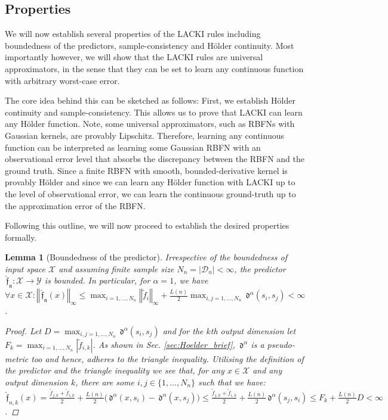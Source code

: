 \documentclass{article} %
\newtheorem{lem}[thm]{Lemma}
\theoremstyle{definition}
\theoremstyle{remark}
\newcommand{\norm}[1]{\left\Vert#1\right\Vert}
\newcommand{\abs}[1]{\left\vert#1\right\vert}
\newcommand{\data}{\ensuremath{ \mathcal D} }
\newcommand{\inspace}{\ensuremath{ \mathcal X}}
\newcommand{\outspace}{\ensuremath{ \mathcal Y}}
\newcommand{\metric}{\, \mathfrak{d}} %
\newcommand{\predf}{\, \mathfrak{  \hat f}} %
\newcommand{\predfn}{\, \mathfrak{  \hat f_n}} %
\newcommand{\hexp}{{ \alpha }}%
\begin{document}
\subsection{Properties}
\label{sec:properties_lacki}
We will now establish several properties of the LACKI rules including boundedness of the predictors, sample-consistency and H\"older continuity. Most importantly however, we will show that the LACKI rules are universal approximators, in the sense that they can be set to learn any continuous function with arbitrary worst-case error.

The core idea behind this can be sketched as follows: 
First, we establish H\"older continuity and sample-consistency. This allows us to prove that LACKI can learn any H\"older function.
Note, some universal approximators, such as RBFNs with Gaussian kernels, are provably Lipschitz. Therefore, learning any continuous function can be interpreted as learning some Gaussian RBFN with an observational error level that absorbs the discrepancy between the RBFN and the ground truth. Since a finite RBFN with smooth, bounded-derivative kernel is provably H\"older and since we can learn any H\"older function with LACKI up to the level of observational error, we can learn the continuous ground-truth up to the approximation error of the RBFN. 

Following this outline, we will now proceed to establish the desired properties formally.

\begin{lem}[Boundedness of the predictor]
Irrespective of the boundedness of input space $\inspace$ and assuming finite sample size  $N_n=\abs{\data_n} < \infty$, the predictor $\predfn:\inspace \to \outspace$ is bounded. In particular,
for $\hexp =1$, we have  
$\forall x \in \inspace: \norm{\predfn(x)}_\infty \leq \max_{i=1,...,N_n} \norm{\tilde f_i}_\infty + \frac{L(n)}{2}  \max_{i,j = 1,...,N_n} \metric^\alpha(s_i,s_j) <\infty$.
\begin{proof}
Let $D = \max_{i,j = 1,...,N_n} \metric^\hexp(s_i,s_j)$ and for the $k$th output dimension let  $F_k= \max_{i=1,...,N_n} \abs{\tilde f_{i,k}}$. As shown in Sec. \ref{sec:Hoelder_brief}, $\metric^\hexp$ is a pseudo-metric too and hence, adheres to the triangle inequality. Utilising the definition of the predictor and the triangle inequality we see that, for any  $x \in \inspace$ and any output dimension $k$, there are some $i,j \in \{1,...,N_n\}$ such that we have: 
$\predf_{n,k}(x) =\frac{\tilde f_{j,k} + \tilde f_{i,k}}{2} + \frac{L(n)}{2} \bigl( \metric^\hexp(x,s_i) - \metric^\hexp(x,s_j) \bigr) \leq \frac{\tilde f_{j,k} + \tilde f_{i,k}}{2} +  \frac{L(n)}{2} \metric^\hexp(s_j,s_i) \leq F_k + \frac{L(n)}{2}  D < \infty$.
\end{proof}
\label{lem:LACKIpredbounded}
\end{lem}
\end{document}

